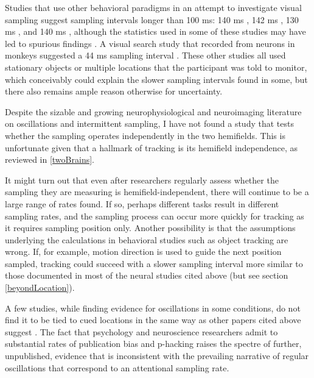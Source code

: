 \documentclass[
]{book}
\begin{document}
Studies that use other behavioral paradigms in an attempt to investigate visual sampling suggest sampling intervals longer than 100 ms: 140 ms \citep{reFeatureBasedAttentionSamples2019}, 142 ms \citep{vanrullenBlinkingSpotlightAttention2007}, 130 ms \citep{fiebelkornReportRhythmicSampling2013}, and 140 ms \citep{dugueAttentionSearchesNonuniformly2015}, although the statistics used in some of these studies may have led to spurious findings \citep{brookshireReevaluatingRhythmicAttentional2021}. A visual search study that recorded from neurons in monkeys suggested a 44 ms sampling interval \citep{buschmanSerialCovertShifts2009}. These other studies all used stationary objects or multiple locations that the participant was told to monitor, which conceivably could explain the slower sampling intervals found in some, but there also remains ample reason otherwise for uncertainty.

Despite the sizable and growing neurophysiological and neuroimaging literature on oscillations and intermittent sampling, I have not found a study that tests whether the sampling operates independently in the two hemifields. This is unfortunate given that a hallmark of tracking is its hemifield independence, as reviewed in \ref{twoBrains}.

It might turn out that even after researchers regularly assess whether the sampling they are measuring is hemifield-independent, there will continue to be a large range of rates found. If so, perhaps different tasks result in different sampling rates, and the sampling process can occur more quickly for tracking as it requires sampling position only. Another possibility is that the assumptions underlying the calculations in behavioral studies such as object tracking are wrong. If, for example, motion direction is used to guide the next position sampled, tracking could succeed with a slower sampling interval more similar to those documented in most of the neural studies cited above (but see section \ref{beyondLocation}).

A few studies, while finding evidence for oscillations in some conditions, do not find it to be tied to cued locations in the same way as other papers cited above suggest \citep{werfNoEvidenceRhythmic2021, petersObjectbasedAttentionPrioritizes2020}. The fact that psychology and neuroscience researchers admit to substantial rates of publication bias and p-hacking \citep{jenningsPublicationBiasNeuroimaging2012, johnMeasuringPrevalenceQuestionable2012, rabeloQuestionableResearchPractices2020} raises the spectre of further, unpublished, evidence that is inconsistent with the prevailing narrative of regular oscillations that correspond to an attentional sampling rate.
\end{document}
